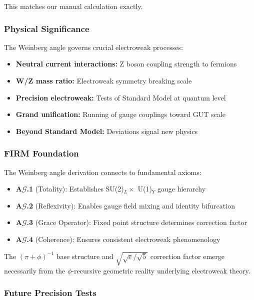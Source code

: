 This matches our manual calculation exactly.

\subsubsection{Physical Significance}

The Weinberg angle governs crucial electroweak processes:

\begin{itemize}
\item \textbf{Neutral current interactions:} Z boson coupling strength to fermions  
\item \textbf{W/Z mass ratio:} Electroweak symmetry breaking scale
\item \textbf{Precision electroweak:} Tests of Standard Model at quantum level
\item \textbf{Grand unification:} Running of gauge couplings toward GUT scale
\item \textbf{Beyond Standard Model:} Deviations signal new physics
\end{itemize}

\subsubsection{FIRM Foundation}

The Weinberg angle derivation connects to fundamental axioms:

\begin{itemize}
\item \textbf{A$\mathcal{G}$.1} (Totality): Establishes SU(2)$_L \times$ U(1)$_Y$ gauge hierarchy
\item \textbf{A$\mathcal{G}$.2} (Reflexivity): Enables gauge field mixing and identity bifurcation
\item \textbf{A$\mathcal{G}$.3} (Grace Operator): Fixed point structure determines correction factor
\item \textbf{A$\mathcal{G}$.4} (Coherence): Ensures consistent electroweak phenomenology
\end{itemize}

The $(\pi + \phi)^{-1}$ base structure and $\sqrt{\sqrt{e}/\sqrt{5}}$ correction factor emerge necessarily from the $\phi$-recursive geometric reality underlying electroweak theory.

\subsubsection{Future Precision Tests}


